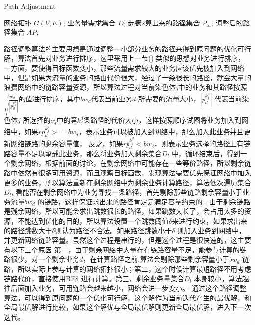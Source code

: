 \begin{algorithm}[t]
\begin{algorithmic}[1]
\caption{{Path Adjustment}}
\label{PathAdj}
\Require
网络拓扑 $G(V, E)$;
业务量需求集合 $D$;
步骤2算出来的路径集合 $P_{in}$;
\Ensure
调整后的路径集合 $AP$;
\Else
{}
\EndIf
\EndFor
{}
\EndIf
\EndFor
{}
\EndIf
\EndFor
{}
\end{algorithmic}
\end{algorithm}
 路径调整算法的主要思想是通过调整一小部分业务的路径来得到原问题的优化可行解，算法首先对业务进行排序，这里采用上一节() 类似的思想对业务进行排序，一方面，要使得目标函数变小，那些流量需求较大的业务应该优先被加入到网络中，但是如果大流量的业务的路由代价很大，经过了一条很长的路径，就会大量的浪费网络中的链路容量资源，所以算法过程对当前染色体$j$中的业务和其路径按照$\frac{bw_d}{\sqrt{|p^{k^d_j}_d|}}$的值进行排序，其中${bw_d}$代表当前业务$d$ 所需要的流量大小，$|p^{k^d_j}_d|$ 代表当前染色体$j$ 所选择的$p^j_d$中的第${k^d_j}$条路径的代价大小，这样按照顺序试图将业务加入到网络中，如果$rp^{k^d_j}_d>=bw_d$，表示业务可以被加入到网络中，那么加入此业务并且更新网络链路的剩余容量值，
反之，如果$rp^{k^d_j}_d<bw_d$，则表示业务选择的路径上有链路容量不足以承载此业务，那么将业务加入剩余集合$D_l$ 中，循环结束后，得到一个剩余网络，根据前面的讨论，在剩余网络中可能存在一些等价路径，所以剩余链路中依然有很多可用资源，而且观察目标函数，发现算法需要优先保证网络中加入更多的业务，所以算法重新在剩余网络中为剩余业务计算路径，算法依次遍历集合$D_l$, 看能否在剩余网络中为业务寻找一条路径，首先剔除那些链路剩余容量小于业务流量$bw_d$ 的链路，这样保证求出来的路径肯定是满足容量约束的，由于剩余链路是残余网络，所以可能会求出跳数很长的路径，如果跳数太长了，会占用太多的资源，不能达到优化的目的，所以算法设置一个跳数阈值$\delta$来进行约束，如果求出来的路径跳数大于$\delta$则认为路径不合法。如果路径跳数小于$\delta$ 则加入业务到网络中，并更新网络链路容量。虽然这个过程是串行的，但是这个过程是很快速的，这主要有以下三个原因 第一，由于剩余网络中大量存在链路容量不足，能参与计算的链路很少，对一个剩余业务$d$，在计算路径之前,算法会剔除那些剩余容量小于$bw_d$ 链路，所以实际上参与计算的网络拓扑很小；第二，这个时候计算最短路径不用考虑链路代价，直接使用BFS 进行计算。第三，剩余业务量集合$D_l$ 本身较小，算法越往后面加入业务，可用链路会越来越小，网络会进一步变小。
  通过这个路径调整算法，可以得到原问题的一个优化可行解，这个解作为当前迭代产生的最优解，和全局最优解进行比较，如果这个解优与全局最优解则更新全局最优解，进入下一次迭代。
